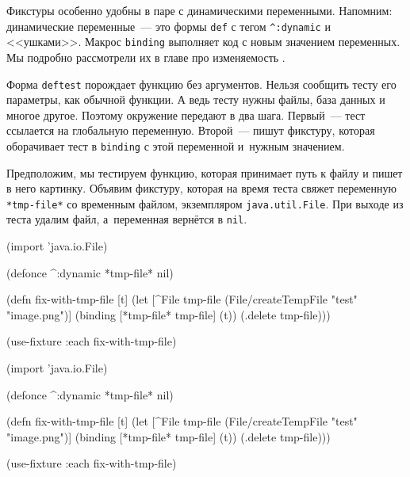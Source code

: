 
Фикстуры особенно удобны в паре с динамическими переменными. Напомним:
динамические переменные~--- это формы \verb|def| с тегом \verb|^:dynamic| и
<<ушками>>. Макрос \verb|binding| выполняет код с новым значением переменных. Мы
подробно рассмотрели их в главе про изменяемость .

Форма \verb|deftest| порождает функцию без аргументов. Нельзя сообщить тесту его
параметры, как обычной функции. А ведь тесту нужны файлы, база данных и многое
другое. Поэтому окружение передают в два шага. Первый~--- тест ссылается на
глобальную переменную. Второй~--- пишут фикстуру, которая оборачивает тест в
\verb|binding| с этой переменной и~нужным значением.

Предположим, мы тестируем функцию, которая принимает путь к файлу и пишет в него
картинку. Объявим фикстуру, которая на время теста свяжет переменную
\verb|*tmp-file*| со временным файлом, экземпляром \verb|java.util.File|. При
выходе из теста удалим файл, а~переменная вернётся в \verb|nil|.


\ifx\DEVICETYPE\MOBILE

\begin{english}
  \begin{clojure}
(import 'java.io.File)

(defonce ^:dynamic *tmp-file* nil)

(defn fix-with-tmp-file [t]
  (let [^File tmp-file
        (File/createTempFile
          "test" "image.png")]
    (binding [*tmp-file* tmp-file]
      (t))
    (.delete tmp-file)))

(use-fixture :each fix-with-tmp-file)
  \end{clojure}
\end{english}

\else

\begin{english}
  \begin{clojure}
(import 'java.io.File)

(defonce ^:dynamic *tmp-file* nil)

(defn fix-with-tmp-file [t]
  (let [^File tmp-file (File/createTempFile "test" "image.png")]
    (binding [*tmp-file* tmp-file]
      (t))
    (.delete tmp-file)))

(use-fixture :each fix-with-tmp-file)
  \end{clojure}
\end{english}

